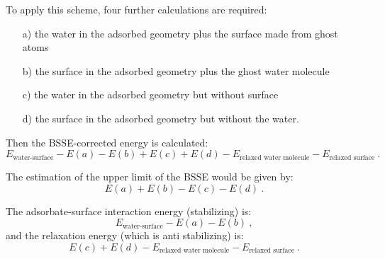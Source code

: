 \documentclass[11pt,DIV=13,BCOR=5mm,a4paper,headinclude]{scrbook}
\begin{document}
To apply this scheme, four further calculations are required:
\begin{itemize}
 \item[a)] the water in the adsorbed geometry plus the surface made from ghost atoms
 \item[b)] the surface in the adsorbed geometry plus the ghost water molecule
 \item[c)] the water in the adsorbed geometry but without surface
 \item[d)] the surface in the adsorbed geometry but without the water.
\end{itemize}

Then the BSSE-corrected energy is calculated:
\begin{equation}\label{eq:BSSEcorr}
 E_{\textrm{water-surface}}-E(a)-E(b)+E(c)+E(d)-E_{\textrm{relaxed water molecule}}-E_{\textrm{relaxed surface}} ~.
\end{equation}

The estimation of the upper limit of the BSSE would be given by:
\begin{equation}
 E(a)+E(b)-E(c)-E(d) ~.
\end{equation}

The adsorbate-surface interaction energy (stabilizing) is:
\begin{equation}
 E_{\textrm{water-surface}}-E(a)-E(b) ~,
\end{equation}
and the relaxation energy (which is anti stabilizing) is:
\begin{equation}\label{eq:relaxE}
 E(c)+E(d)-E_{\textrm{relaxed water molecule}}-E_{\textrm{relaxed surface}} ~.
\end{equation}
\end{document}
